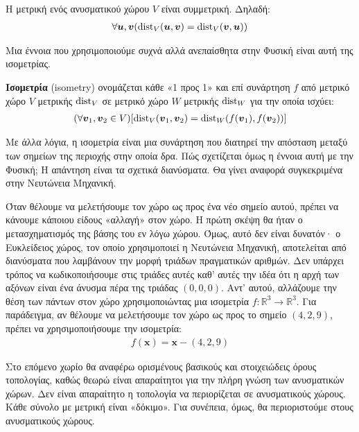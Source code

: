 \documentclass[main.tex]{subfiles}
\begin{document}
	\begin{theorem}
		Η μετρική ενός ανυσματικού χώρου $V$ είναι συμμετρική. Δηλαδή:
		\begin{align*}
			\forall\boldsymbol{u},\boldsymbol{v}(\operatorname{dist}_V(\boldsymbol{u}, \boldsymbol{v}) = \operatorname{dist}_V(\boldsymbol{v}, \boldsymbol{u}))
		\end{align*}
	\end{theorem}

	Μια έννοια που χρησιμοποιούμε συχνά αλλά ανεπαίσθητα στην Φυσική είναι αυτή της ισομετρίας.
	\begin{definition}
		\textbf{Ισομετρία} (isometry) ονομάζεται κάθε «1 προς 1» και επί συνάρτηση $f$ από μετρικό χώρο $V$ μετρικής $\operatorname{dist}_V$ σε μετρικό χώρο $W$ μετρικής $\operatorname{dist}_W$ για την οποία ισχύει:
		\begin{align*}
			(\forall \boldsymbol{v}_1,\boldsymbol{v}_2\in V)[\operatorname{dist}_V(\boldsymbol{v}_1, \boldsymbol{v}_2) = \operatorname{dist}_W(f(\boldsymbol{v}_1), f(\boldsymbol{v}_2))]
		\end{align*} 
	\end{definition}
	Με άλλα λόγια, η ισομετρία είναι μια συνάρτηση που διατηρεί την απόσταση μεταξύ των σημείων της περιοχής στην οποία δρα. Πώς σχετίζεται όμως η έννοια αυτή με την Φυσική; Η απάντηση είναι τα σχετικά διανύσματα. Θα γίνει αναφορά συγκεκριμένα στην Νευτώνεια Μηχανική.
	
	Όταν θέλουμε να μελετήσουμε τον χώρο ως προς ένα νέο σημείο αυτού, πρέπει να κάνουμε κάποιου είδους «αλλαγή» στον χώρο. Η πρώτη σκέψη θα ήταν ο μετασχηματισμός της βάσης του εν λόγω χώρου. Όμως, αυτό δεν είναι δυνατόν· ο Ευκλείδειος χώρος, τον οποίο χρησιμοποιεί η Νευτώνεια Μηχανική, αποτελείται από διανύσματα που λαμβάνουν την μορφή τριάδων πραγματικών αριθμών. Δεν υπάρχει τρόπος να κωδικοποιήσουμε στις τριάδες αυτές καθ' αυτές την ιδέα ότι η αρχή των αξόνων είναι ένα άνυσμα πέρα της τριάδας $(0,0,0)$. Αντ' αυτού, αλλάζουμε την θέση των πάντων στον χώρο χρησιμοποιώντας μια ισομετρία $f: \mathbb{R}^3 \rightarrow \mathbb{R}^3$. Για παράδειγμα, αν θέλουμε να μελετήσουμε τον χώρο ως προς το σημείο $(4,2,9)$, πρέπει να χρησιμοποιήσουμε την ισομετρία:
	\begin{align*}
		f(\boldsymbol{x}) = \boldsymbol{x} - (4,2,9)
	\end{align*}

	\begin{remark}
		Στο επόμενο χωρίο θα αναφέρω ορισμένους βασικούς και στοιχειώδεις όρους τοπολογίας, καθώς θεωρώ είναι απαραίτητοι για την πλήρη γνώση των ανυσματικών χώρων. Δεν είναι απαραίτητο η τοπολογία να περιορίζεται σε ανυσματικούς χώρους. Κάθε σύνολο με μετρική είναι «δόκιμο». Για συνέπεια, όμως, θα περιοριστούμε στους ανυσματικούς χώρους.
	\end{remark}
\end{document}
